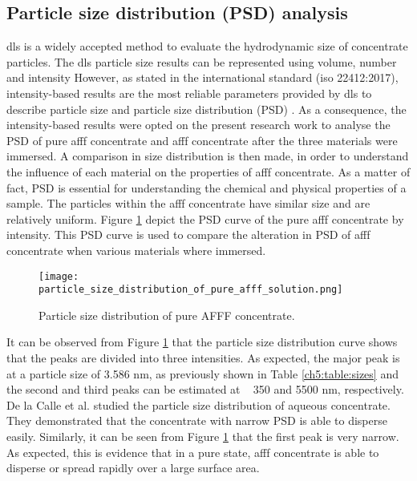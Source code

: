 \subsection{Particle size distribution (PSD) analysis} 
\acrshort{dls} is a widely accepted method to evaluate the hydrodynamic size of concentrate particles. The \acrshort{dls} particle size results can be represented using volume, number and intensity However, as stated in the international standard (\acrshort{iso} 22412:2017), intensity-based results are the most reliable parameters provided by \acrshort{dls} to describe particle size and particle size distribution (PSD) \cite{bellamy1980infrared}. As a consequence, the intensity-based results were opted on the present research work to analyse the PSD of pure \acrshort{afff} concentrate and \acrshort{afff} concentrate after the three materials were immersed. A comparison in size distribution is then made, in order to understand the influence of each material on the properties of \acrshort{afff} concentrate. As a matter of fact, PSD is essential for understanding the chemical and physical properties of a sample. The particles within the \acrshort{afff} concentrate have similar size and are relatively uniform. Figure \ref{ch5:figure:pure_afff} depict the PSD curve of the pure \acrshort{afff} concentrate by intensity. This PSD curve is used to compare the alteration in PSD of \acrshort{afff} concentrate when various materials where immersed. 

\begin{figure}[H]
    \centering
    \texttt{[image: particle\_size\_distribution\_of\_pure\_afff\_solution.png]}
    \caption{Particle size distribution of pure AFFF concentrate.}
    \label{ch5:figure:pure_afff}
\end{figure}

 It can be observed from Figure \ref{ch5:figure:pure_afff} that the particle size distribution curve shows that the peaks are divided into three intensities. As expected, the major peak is at a particle size of 3.586 nm, as previously shown in Table \ref{ch5:table:sizes} and the second and third peaks can be estimated at ~ 350 and 5500 nm, respectively. De la Calle et al. \cite{mudunkotuwa2014atr} studied the particle size distribution of aqueous concentrate. They demonstrated that the concentrate with narrow PSD is able to disperse easily. Similarly, it can be seen from Figure \ref{ch5:figure:pure_afff} that the first peak is very narrow. As expected, this is evidence that in a pure state, \acrshort{afff} concentrate is able to disperse or spread rapidly over a large surface area.

